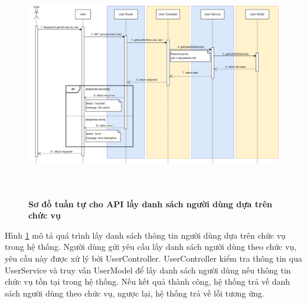 \begin{figure}[H]
  \centering
  \includegraphics[width=16cm,height=10cm]{Images/sequence_api/getUserByRole.png}
  \caption[Sơ đồ tuần tự cho API lấy danh sách người dùng dựa trên chức vụ ]{\bfseries \fontsize{12pt}{0pt}
  \selectfont Sơ đồ tuần tự cho API lấy danh sách người dùng dựa trên chức vụ }
  \label{api_getUserByRole} %
\end{figure}
Hình \ref{api_getUserByRole} mô tả quá trình lấy danh sách thông tin người dùng dựa trên chức vụ trong hệ thống. Người dùng gửi yêu cầu lấy danh sách người dùng theo chức vụ, yêu cầu này được xử lý bởi UserController. UserController kiểm tra thông tin qua UserService và truy vấn UserModel để lấy danh sách người dùng nếu thông tin 
chức vụ tồn tại trong hệ thống. Nếu kết quả thành công, hệ thống trả về danh sách người dùng theo chức vụ, ngược lại, hệ thống trả về lỗi tương ứng.

